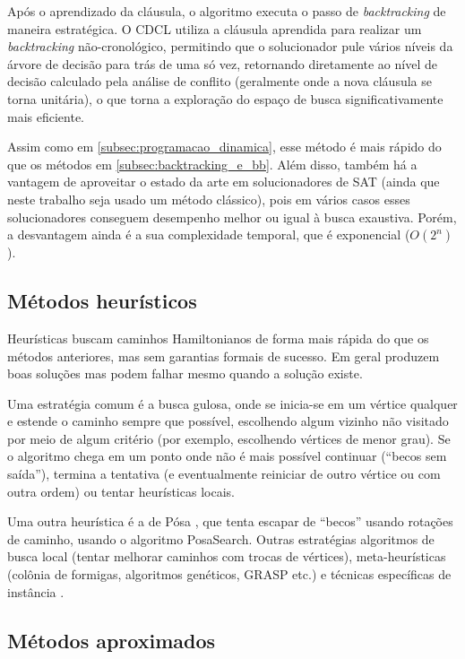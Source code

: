 Após o aprendizado da cláusula, o algoritmo executa o passo de \textit{backtracking} de maneira estratégica. O CDCL utiliza a cláusula aprendida para realizar um \textit{backtracking} não-cronológico, permitindo que o solucionador pule vários níveis da árvore de decisão para trás de uma só vez, retornando diretamente ao nível de decisão calculado pela análise de conflito (geralmente onde a nova cláusula se torna unitária), o que torna a exploração do espaço de busca significativamente mais eficiente.

Assim como em \ref{subsec:programacao_dinamica}, esse método é mais rápido  do que os métodos em \ref{subsec:backtracking_e_bb}. Além disso, também há a vantagem de aproveitar o estado da arte em solucionadores de SAT (ainda que neste trabalho seja usado um método clássico), pois em vários casos esses solucionadores conseguem desempenho melhor ou igual à busca exaustiva. Porém, a desvantagem ainda é a sua complexidade temporal, que é exponencial ($O(2^n)$).

\subsection{Métodos heurísticos}

Heurísticas buscam caminhos Hamiltonianos de forma mais rápida do que os métodos anteriores, mas sem garantias formais de sucesso. Em geral produzem boas soluções mas podem falhar mesmo quando a solução existe.

Uma estratégia comum é a busca gulosa, onde se inicia-se em um vértice qualquer e estende o caminho sempre que possível, escolhendo algum vizinho não visitado por meio de algum critério (por exemplo, escolhendo vértices de menor grau). Se o algoritmo chega em um ponto onde não é mais possível continuar (``becos sem saída''), termina a tentativa (e eventualmente reiniciar de outro vértice ou com outra ordem) ou tentar heurísticas locais.

Uma outra heurística é a de Pósa \cite{shields2004,POSA1976}, que tenta escapar de ``becos'' usando rotações de caminho, usando o algoritmo PosaSearch. Outras estratégias algoritmos de busca local (tentar melhorar caminhos com trocas de vértices), meta-heurísticas (colônia de formigas, algoritmos genéticos, GRASP etc.) e técnicas específicas de instância \cite{shields2004}.


\subsection{Métodos aproximados}

